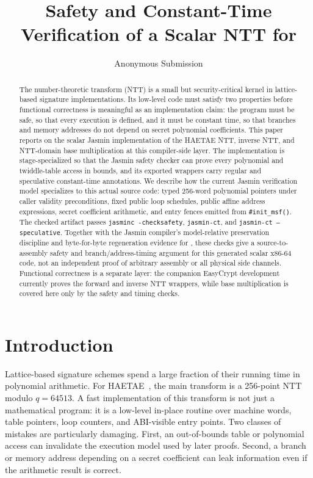 \documentclass[10pt,twocolumn]{article}
\title{\vspace{-0.8em}Safety and Constant-Time Verification of a Scalar \jasmin{} NTT for \haetae{}}
\author{Anonymous Submission}
\date{}
\newcommand{\haetae}{HAETAE}
\newcommand{\jasmin}{Jasmin}
\newcommand{\ct}{constant-time}
\begin{document}
\maketitle
\vspace{-1.1em}

\begin{abstract}
The number-theoretic transform (NTT) is a small but security-critical kernel in
lattice-based signature implementations.  Its low-level code must satisfy two
properties before functional correctness is meaningful as an implementation
claim: the program must be safe, so that every execution is defined, and it must
be constant time, so that branches and memory addresses do not depend on secret
polynomial coefficients.  This paper reports on the scalar \jasmin{}
implementation of the \haetae{} NTT, inverse NTT, and NTT-domain base
multiplication at this compiler-side layer.  The implementation is
stage-specialized so that the \jasmin{} safety checker can prove every
polynomial and twiddle-table access in bounds, and its exported wrappers carry
regular and speculative \ct{} annotations.  We describe how the current
\jasmin{} verification model specializes to this actual source code: typed
256-word polynomial pointers under caller validity preconditions, fixed public
loop schedules, public affine address expressions, secret coefficient
arithmetic, and entry fences emitted from \texttt{\#init\_msf()}.  The checked
artifact passes
\texttt{jasminc -checksafety}, \texttt{jasmin-ct}, and
\texttt{jasmin-ct --speculative}.  Together with the \jasmin{} compiler's
model-relative preservation discipline and byte-for-byte regeneration evidence
for , these checks give a source-to-assembly safety and
branch/address-timing argument for this generated scalar x86-64 code, not an
independent proof of arbitrary assembly or all physical side channels.
Functional correctness is a
separate layer: the companion EasyCrypt development currently proves the
forward and inverse NTT wrappers, while base multiplication is covered here only
by the safety and timing checks.
\end{abstract}

\section{Introduction}

Lattice-based signature schemes spend a large fraction of their running time in
polynomial arithmetic.  For \haetae{}~\cite{HAETAE2022}, the main transform is a
256-point NTT modulo \(q=64513\).  A fast implementation of this transform is
not just a mathematical program: it is a low-level in-place routine over machine
words, table pointers, loop counters, and ABI-visible entry points.  Two
classes of mistakes are particularly damaging.  First, an out-of-bounds table or
polynomial access can invalidate the execution model used by later proofs.
Second, a branch or memory address depending on a secret coefficient can leak
information even if the arithmetic result is correct.
\end{document}
